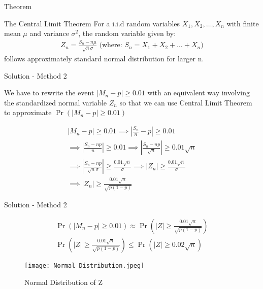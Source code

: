 \documentclass{beamer}
\providecommand{\abs}[1]{\vert#1\vert}
\providecommand{\pr}[1]{\ensuremath{\Pr\left(#1\right)}}
\begin{document}
\begin{frame}{Theorem}
\begin{block}{The Central Limit Theorem}
 For a i.i.d random variables $X_1,X_2,\dots,X_n$ with finite mean $\mu$ and variance $\sigma^2$, the random variable given by:
    \begin{align}
    Z_n = \frac{S_n - n\mu}{\sqrt{n}\sigma} \text{ (where: }S_n = X_1+X_2+\dots+X_n)
      \end{align}
follows approximately standard normal distribution for larger n.

\end{block}    
\end{frame}

\begin{frame}{Solution - Method 2}
\begin{block}{}
       We have to rewrite the event $\abs{M_n - p} \geq 0.01$ with an equivalent way involving the standardized normal variable $Z_n$ so that we can use Central Limit Theorem to approximate $\pr{\abs{M_n - p} \geq 0.01}$
\end{block}
\begin{block}{}
\begin{align}
    \abs{M_n - p} \geq 0.01 \implies \left|\frac{S_n}{n} - p\right| \geq 0.01\\ 
    \implies \left|\frac{S_n - np}{n}\right| \geq 0.01 \implies \left|\frac{S_n - np}{\sqrt{n}}\right| \geq 0.01 \sqrt{n} \\
    \implies \left|\frac{S_n - np}{\sqrt{n}\sigma}\right| \geq \frac{0.01 \sqrt{n}}{\sigma} \implies \abs{Z_n} \geq \frac{0.01 \sqrt{n}}{\sigma} \\
    \implies \abs{Z_n} \geq \frac{0.01 \sqrt{n}}{\sqrt{p(1-p)}}
\end{align}
\end{block}

\end{frame}

\begin{frame}{Solution - Method 2}

\begin{block}{}
\begin{align}
    \pr{\abs{M_n - p} \geq 0.01} \approx \pr{\abs{Z} \geq \frac{0.01 \sqrt{n}}{\sqrt{p(1-p)}}} \\
    \pr{\abs{Z} \geq \frac{0.01 \sqrt{n}}{\sqrt{p(1-p)}}} \leq \pr{\abs{Z} \geq 0.02 \sqrt{n}}
\end{align}
\end{block}
\begin{figure}[ht]
    \centering
    \texttt{[image: Normal Distribution.jpeg]}
    \caption{Normal Distribution of Z}
    \label{Normal Distribution of Z}
\end{figure}

\end{frame}
\end{document}
